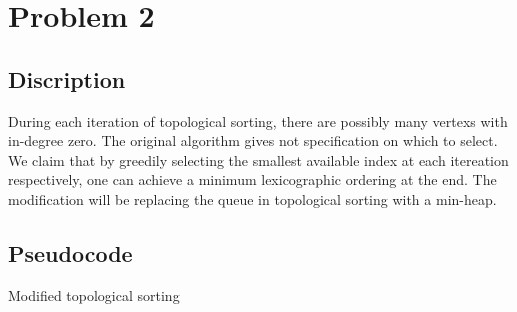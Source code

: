 \documentclass{report}
\begin{document}
    \section*{Problem 2}
    \subsection*{Discription}
    During each iteration of topological sorting, there are possibly many vertexs with 
    in-degree zero. The original algorithm gives not specification on which to select. 
    We claim that by greedily selecting the smallest available index at each itereation 
    respectively, one can achieve a minimum lexicographic ordering at the end.
    The modification will be replacing the queue in topological sorting with a min-heap. 

    \subsection*{Pseudocode}
    \begin{algorithm}
        \caption{Modified topological sorting}
        \begin{algorithmic}[1]
                \EndIf{}
            \EndFor{}
                    \EndIf{}
                \EndFor{}
            \EndWhile{}
        \end{algorithmic}
    \end{algorithm}
\end{document}
